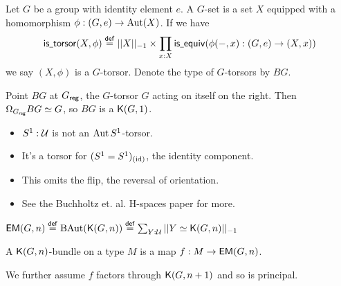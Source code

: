 \documentclass[14pt,aspectratio=169]{beamer}
\renewcommand{\defemph}[1]{\alert{#1}}
\begin{document}
\begin{frame}
\begin{definition}
Let \( G \) be a group with identity element \( e \). A \defemph{\( G \)-set} is a set \( X \) equipped with a homomorphism \( \phi:(G,e)\to\operatorname{Aut}(X) \). If we have
\[ 
\mathsf{is\underscore torsor}(X,\phi)\defeq ||X||_{-1}\times \pit{x:X}\mathsf{is\underscore equiv}(\phi(-,x):(G,e)\to (X,x))
\] we say \( (X,\phi) \) is a \defemph{\( G \)-torsor}. Denote the type of \( G \)-torsors by \( BG \).
\end{definition}
\begin{lemma}
Point \( BG \) at \( {G}_{\mathsf{reg}} \), the \( G \)-torsor \( G \) acting on itself on the right. Then \( \Omega_{{G}_{\mathsf{reg}}} BG \simeq G \), so \( BG \) is a \( \mathsf{K}(G,1) \).
\end{lemma}
\end{frame}

\begin{frame}
\begin{itemize}
\item \( S^1:\mathcal{U} \) is not an \( \operatorname{Aut} S^1 \)-torsor.
\item It's a torsor for \( (S^1=S^1)_{(\text{id})} \), the identity component.
\item This omits the flip, the reversal of \alert{orientation}.
\item See the Buchholtz et. al. H-spaces paper for more.
\end{itemize}
\end{frame}

\begin{frame}
\begin{definition}
\( \mathsf{EM}(G,n)\stackrel{\mathsf{def}}{=} \operatorname{BAut}(\mathsf{K}(G,n))\stackrel{\mathsf{def}}{=} \sum_{Y:\mathcal{U}}||Y\simeq \mathsf{K}(G,n)||_{-1} \)
\end{definition}
\begin{definition}
A \defemph{\( \mathsf{K}(G,n) \)-bundle} on a type \( M \) is a map \( f:M\to \mathsf{EM}(G,n) \).
\end{definition}
We further assume \( f \) factors through \( \mathsf{K}(G,n+1) \) and so is principal.
\end{frame}
\end{document}
